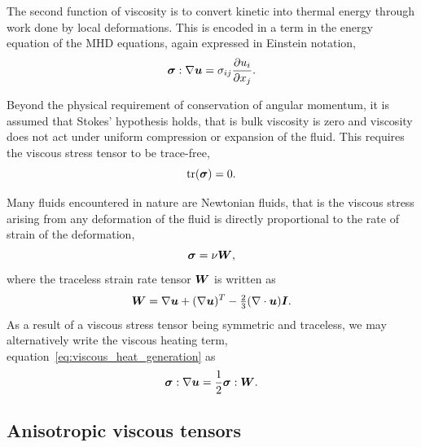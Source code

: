 The second function of viscosity is to convert kinetic into thermal energy through work done by local deformations. This is encoded in a term in the energy equation of the MHD equations, again expressed in Einstein notation,
\begin{equation}
  \label{eq:viscous_heat_generation}
  {\bm \sigma} : \nabla {\bm u} = \sigma_{ij} \frac{\partial u_i}{\partial x_j}.
\end{equation}

Beyond the physical requirement of conservation of angular momentum, it is assumed that Stokes' hypothesis holds, that is bulk viscosity is zero and viscosity does not act under uniform compression or expansion of the fluid. This requires the viscous stress tensor to be trace-free,
\begin{equation}
  \label{eq:trace_free_tensor}
  \text{tr}({\bm \sigma}) = 0.
\end{equation}

Many fluids encountered in nature are Newtonian fluids, that is the viscous stress arising from any deformation of the fluid is directly proportional to the rate of strain of the deformation,
\begin{equation}
  \label{eq:isotropic_viscous_tensor}
  {\bm \sigma} = \nu {\bm W},
\end{equation}
where the traceless strain rate tensor ${\bm W}$ is written as
\begin{equation}
  \label{eq:rate_of_strain}
  {\bm W} = \nabla{\bm u} + (\nabla{\bm u})^T - \tfrac{2}{3}(\nabla \cdot {\bm u}){\bm I}.
\end{equation}
As a result of a viscous stress tensor being symmetric and traceless, we may alternatively write the viscous heating term, equation~\ref{eq:viscous_heat_generation} as
\begin{equation}
  \label{eq:viscous_heat_generation2}
  {\bm \sigma} : \nabla {\bm u} = \frac{1}{2} {\bm \sigma} : {\bm W}.
\end{equation}

\subsection{Anisotropic viscous tensors}

